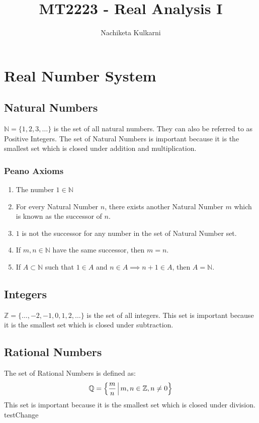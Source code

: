 \documentclass[12pt, oneside]{book}
\date{}
\title{MT2223 - Real Analysis I}
\author{Nachiketa Kulkarni}
\begin{document}
\maketitle
\tableofcontents

\mainmatter
\chapter{Real Number System}
\section{Natural Numbers}
\( \mathbb{N} = \{ 1,2,3,\dots \} \) is the set of all natural numbers.
They can also be referred to as Positive Integers.
The set of Natural Numbers is important because it is the smallest set which is closed under addition and multiplication.

\subsection{Peano Axioms}
\begin{enumerate}
	\item The number \(1 \in \mathbb{N}\)
	\item For every Natural Number \(n\), there exists another Natural Number \(m\) which is known as the successor of \(n\).
	\item \(1\) is not the successor for any number in the set of Natural Number set.
	\item If \(m,n \in \mathbb{N}\) have the same successor, then \(m=n\).
	\item If \(A \subset \mathbb{N}\) such that \(1 \in A\) and \(n \in A \implies n+1 \in A\), then \(A = \mathbb{N}\).
\end{enumerate}

\section{Integers}
\( \mathbb{Z} = \{ \dots, -2, -1, 0, 1, 2, \dots \} \) is the set of all integers.
This set is important because it is the smallest set which is closed under subtraction.

\section{Rational Numbers}
The set of Rational Numbers is defined as:
\[ \mathbb{Q} = \left\{ \frac{m}{n} \; \vline \; m,n \in \mathbb{Z}, n \neq 0 \right\} \]
This set is important because it is the smallest set which is closed under division.
testChange
\end{document}
